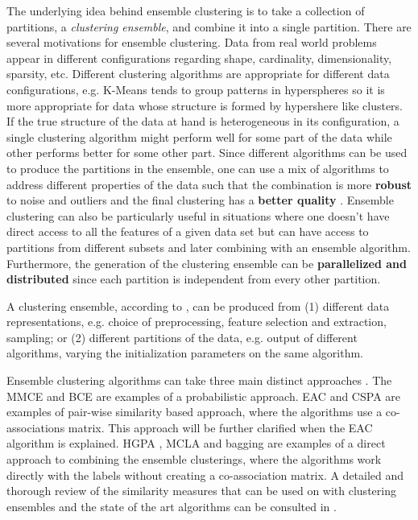 The underlying idea behind ensemble clustering is to take a collection of partitions, a \emph{clustering ensemble}, and combine it into a single partition.
There are several motivations for ensemble clustering.
Data from real world problems appear in different configurations regarding shape, cardinality, dimensionality, sparsity, etc. 
Different clustering algorithms are appropriate for different data configurations, e.g. K-Means tends to group patterns in hyperspheres \cite{Jain1999} so it is more appropriate for data whose structure is formed by hypershere like clusters.
If the true structure of the data at hand is heterogeneous in its configuration, a single clustering algorithm might perform well for some part of the data while other performs better for some other part.
Since different algorithms can be used to produce the partitions in the ensemble, one can use a mix of algorithms to address different properties of the data such that the combination is more \textbf{robust} to noise and outliers \cite{topchy2004mixture} and the final clustering has a \textbf{better quality} \cite{Aggarwal2014}.
Ensemble clustering can also be particularly useful in situations where one doesn't have direct access to all the features of a given data set but can have access to partitions from different subsets and later combining with an ensemble algorithm.
Furthermore, the generation of the clustering ensemble can be \textbf{parallelized and distributed} since each partition is independent from every other partition.

A clustering ensemble, according to \cite{Fred2005}, can be produced from (1) different data representations, e.g. choice of preprocessing, feature selection and extraction, sampling; or (2) different partitions of the data, e.g. output of different algorithms, varying the initialization parameters on the same algorithm.

Ensemble clustering algorithms can take three main distinct approaches \cite{Aggarwal2014}.
The MMCE \cite{topchy2004mixture} and BCE \cite{wang2011bayesian} are examples of a probabilistic approach.
EAC \cite{Fred2005} and CSPA \cite{Strehl2002} are examples of pair-wise similarity based approach, where the algorithms use a co-associations matrix.
This approach will be further clarified when the EAC algorithm is explained.
HGPA \cite{Strehl2002}, MCLA \cite{Strehl2002} and bagging \cite{Dudoit2003} are examples of a direct approach to combining the ensemble clusterings, where the algorithms work directly with the labels without creating a co-association matrix.
A detailed and thorough review of the similarity measures that can be used on with clustering ensembles and the state of the art algorithms can be consulted in \cite{Aggarwal2014}.

